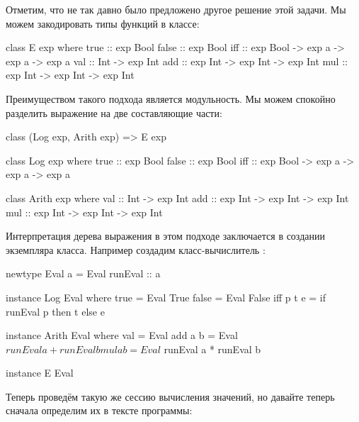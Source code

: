 Отметим, что не так давно было предложено другое решение
этой задачи. Мы можем закодировать типы функций в классе:

\begin{code}
class E exp where
    true    :: exp Bool
    false   :: exp Bool
    iff     :: exp Bool -> exp a -> exp a -> exp a
    val     :: Int -> exp Int
    add     :: exp Int -> exp Int -> exp Int
    mul     :: exp Int -> exp Int -> exp Int    
\end{code}

Преимуществом такого подхода является модульность. 
Мы можем спокойно разделить выражение на две 
составляющие части:  


\begin{code}
class (Log exp, Arith exp) => E exp

class Log exp where
    true    :: exp Bool
    false   :: exp Bool
    iff     :: exp Bool -> exp a -> exp a -> exp a

class Arith exp where
    val     :: Int -> exp Int
    add     :: exp Int -> exp Int -> exp Int
    mul     :: exp Int -> exp Int -> exp Int
\end{code}

Интерпретация дерева выражения в этом подходе 
заключается в создании экземпляра класса. 
Например создадим класс-вычислитель :

\begin{code}
newtype Eval a = Eval { runEval :: a }

instance Log Eval where
    true    = Eval True
    false   = Eval False
    iff p t e = if runEval p then t else e

instance Arith Eval where
    val     = Eval
    add a b = Eval $ runEval a + runEval b
    mul a b = Eval $ runEval a * runEval b

instance E Eval
\end{code}

Теперь проведём такую же сессию вычисления значений,
но давайте теперь сначала определим их в тексте программы: 


